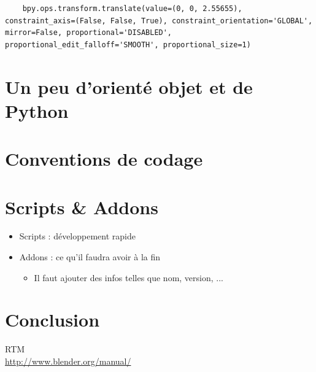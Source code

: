 \documentclass[11pt,usenames,dvipsnames]{beamer}
\begin{document}
\begin{frame}[fragile]
  \begin{lstlisting}
    bpy.ops.transform.translate(value=(0, 0, 2.55655), constraint_axis=(False, False, True), constraint_orientation='GLOBAL', mirror=False, proportional='DISABLED', proportional_edit_falloff='SMOOTH', proportional_size=1)
  \end{lstlisting}
\end{frame}


\section{Un peu d'orienté objet et de Python}

\section{Conventions de codage}

\section{Scripts \& Addons}

\begin{frame}
  \begin{itemize}
    \item Scripts : développement rapide
    \item Addons : ce qu'il faudra avoir à la fin
      \begin{itemize}
      \item Il faut ajouter des infos telles que nom, version, ...
      \end{itemize}

  \end{itemize}
\end{frame}

\section{Conclusion}
\begin{frame}
  RTM\\
  \url{http://www.blender.org/manual/}
\end{frame}
\end{document}
